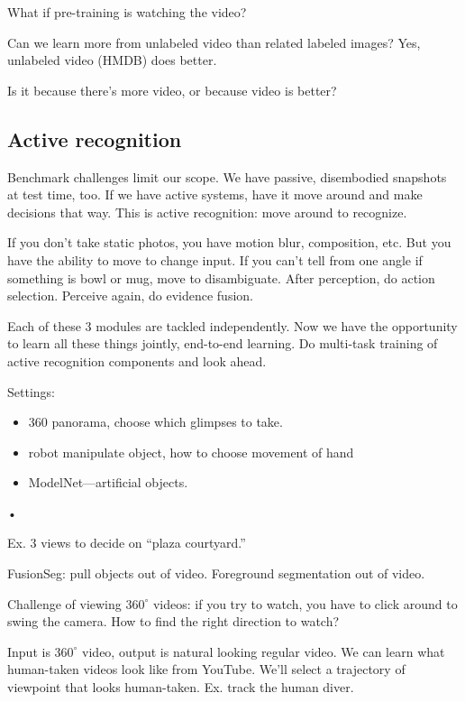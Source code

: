 What if pre-training is watching the video? 

Can we learn more from unlabeled video than related labeled images?
Yes, unlabeled video (HMDB) does better.

Is it because there's more video, or because video is better?

\subsection{Active recognition}

Benchmark challenges limit our scope. We have passive, disembodied snapshots at test time, too. If we have active systems, have it move around and make decisions that way. This is active recognition: move around to recognize.

If you don't take static photos, you have motion blur, composition, etc. But you have the ability to move to change input. If you can't tell from one angle if something is bowl or mug, move to disambiguate.
After perception, do action selection. Perceive again, do evidence fusion. 

Each of these 3 modules are tackled independently. Now we have the opportunity to learn all these things jointly, end-to-end learning. Do multi-task training of active recognition components and look ahead.

Settings:
\begin{itemize}
\item
360 panorama, choose which glimpses to take.
\item
robot manipulate object, how to choose movement of hand
\item
ModelNet---artificial objects.
\end{itemize}•

Ex. 3 views to decide on ``plaza courtyard.''

FusionSeg: pull objects out of video. Foreground segmentation out of video.

Challenge of viewing $360^{\circ}$ videos: if you try to watch, you have to click around to swing the camera.
How to find the right direction to watch?

Input is $360^{\circ}$ video, output is natural looking regular video. We can learn what human-taken videos look like from YouTube. We'll select a trajectory of viewpoint that looks human-taken. Ex. track the human diver.


